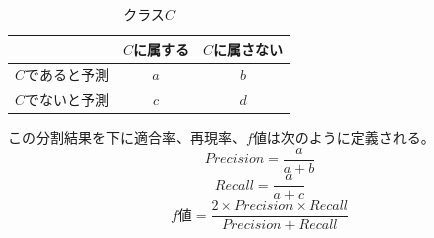 \documentclass[titlepage,12pt]{jreport}
\begin{document}
\begin{table}[tbp]
\begin{center}
\caption{クラス$C$}
\begin{tabular}{|c|c|c|}\hline
&$C$に属する&$C$に属さない\\ \hline
$C$であると予測&$a$&$b$\\ \hline
$C$でないと予測&$c$&$d$\\ \hline
\end{tabular}
\label{fig:class}
\end{center}
\end{table}


この分割結果を下に適合率、再現率、$f$値は次のように定義される。
\begin{equation}
Precision = \frac{a}{a+b}
\end{equation}
\begin{equation}
Recall = \frac{a}{a+c}
\end{equation}
\begin{equation}
f値 = \frac{2 \times Precision \times Recall}{Precision + Recall}
\end{equation}
\end{document}
